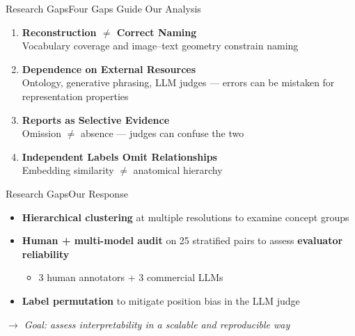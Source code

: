 \begin{frame}{Research Gaps}{Four Gaps Guide Our Analysis}
  \begin{enumerate}
    \item \textbf{Reconstruction $\neq$ Correct Naming}\\
    Vocabulary coverage and image--text geometry constrain naming

    \item \textbf{Dependence on External Resources}\\
    Ontology, generative phrasing, LLM judges --- errors can be mistaken for representation properties

    \item \textbf{Reports as Selective Evidence}\\
    Omission $\neq$ absence --- judges can confuse the two

    \item \textbf{Independent Labels Omit Relationships}\\
    Embedding similarity $\neq$ anatomical hierarchy
  \end{enumerate}

\end{frame}

\begin{frame}{Research Gaps}{Our Response}
  \begin{itemize}
    \item \textbf{Hierarchical clustering} at multiple resolutions to examine concept groups
    \item \textbf{Human + multi-model audit} on 25 stratified pairs to assess \textbf{evaluator reliability}
    \begin{itemize}
      \item 3 human annotators + 3 commercial LLMs
    \end{itemize}
    \item \textbf{Label permutation} to mitigate position bias in the LLM judge
  \end{itemize}

  \vspace{0.4cm}
  \centering
  \textit{$\rightarrow$ Goal: assess interpretability in a scalable and reproducible way}

\end{frame}